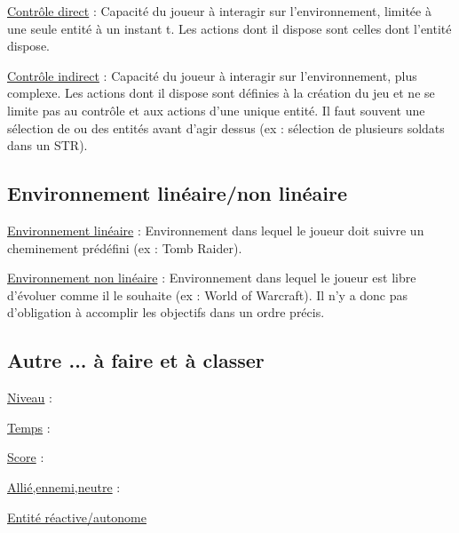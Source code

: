 \underline{Contrôle direct} :
Capacité du joueur à interagir sur l’environnement, limitée à une seule entité à un instant t. 
Les actions dont il dispose sont celles dont l'entité dispose.

\underline{Contrôle indirect} :
Capacité du joueur à interagir sur l’environnement, plus complexe. 
Les actions dont il dispose sont définies à la création du jeu et ne se limite pas au contrôle et aux actions d'une unique entité.
Il faut souvent une sélection de ou des entités avant d'agir dessus (ex : sélection de plusieurs soldats dans un STR).

\subsection*{Environnement linéaire/non linéaire}

\underline{Environnement linéaire} : 
Environnement dans lequel le joueur doit suivre un cheminement prédéfini (ex : Tomb Raider).

\underline{Environnement non linéaire} : 
Environnement dans lequel le joueur est libre d'évoluer comme il le souhaite (ex : World of Warcraft). 
Il n'y a donc pas d'obligation à accomplir les objectifs dans un ordre précis.


\subsection*{Autre ... à faire et à classer}

\underline{Niveau} :

\underline{Temps} :

\underline{Score} :

\underline{Allié,ennemi,neutre} :

\underline{Entité réactive/autonome}

